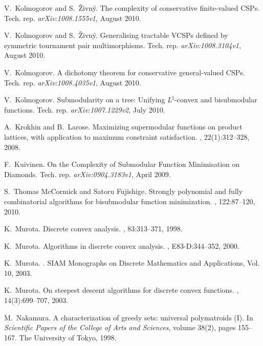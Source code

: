 \documentclass[11pt,onecolumn]{article}
\begin{document}
\begin{thebibliography}{10}
V.~Kolmogorov and S.~\v{Z}ivn\'y.
\newblock The complexity of conservative finite-valued {C}{S}{P}s.
\newblock Tech. rep. {\em arXiv:1008.1555v1}, August 2010.

V.~Kolmogorov and S.~\v{Z}ivn\'y.
\newblock Generalising tractable {V}{C}{S}{P}s defined by symmetric tournament pair multimorphisms.
\newblock Tech. rep. {\em arXiv:1008.3104v1}, August 2010.

V.~Kolmogorov.
\newblock A dichotomy theorem for conservative general-valued {C}{S}{P}s.
\newblock Tech. rep. {\em arXiv:1008.4035v1}, August 2010.

V.~Kolmogorov.
\newblock Submodularity on a tree: Unifying $L^\natural$-convex and bisubmodular functions.
\newblock Tech. rep. {\em arXiv:1007.1229v2}, July 2010.

A.~Krokhin and B.~Larose.
\newblock Maximizing supermodular functions on product lattices, with application to maximum constraint satisfaction.
, 22(1):312--328, 2008.

F.~Kuivinen.
\newblock On the Complexity of Submodular Function Minimisation on Diamonds.
\newblock Tech. rep. {\em arXiv:0904.3183v1}, April 2009.

S.~Thomas McCormick and Satoru Fujishige.
\newblock Strongly polynomial and fully combinatorial algorithms for
  bisubmodular function minimization.
, 122:87--120, 2010.

K.~Murota.
\newblock Discrete convex analysis.
, 83:313--371, 1998.

K.~Murota.
\newblock Algorithms in discrete convex analysis.
, E83-D:344--352,
  2000.

K.~Murota.
.
\newblock SIAM Monographs on Discrete Mathematics and Applications, Vol. 10,
  2003.

K.~Murota.
\newblock On steepest descent algorithms for discrete convex functions.
, 14(3):699--707, 2003.

M.~Nakamura.
\newblock A characterization of greedy sets: universal polymatroids ({I}).
\newblock In {\em Scientific Papers of the College of Arts and Sciences},
  volume 38(2), pages 155--167. The University of Tokyo, 1998.


\end{thebibliography}
\end{document}
